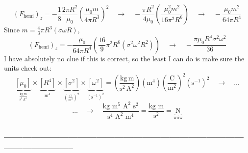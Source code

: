 \documentclass[a4paper,12pt]{article} %
\begin{document}
$$ \left(F_{\text{hemi}}\right)_z = -\frac{1}{8}\frac{2\pi R^2}{\mu_0}\left(\frac{\mu_0m}{4\pi R^3}\right)^2 \quad\rightarrow\quad -\frac{\pi R^2}{4\mu_0} \left(\frac{\mu_0^2m^2}{16\pi^2R^6}\right) \quad\rightarrow\quad -\frac{\mu_0m^2}{64\pi R^4}$$
Since $m=\frac{4}{3} \pi R^3(\sigma \omega R)$,
$$ \boxed{\left(F_{\text{hemi}}\right)_z = -\frac{\mu_0}{64\pi R^4} \left(\frac{16}{9}\pi^2 R^6 \left(\sigma^2\omega^2R^2\right)\right) \quad\rightarrow\quad -\frac{\pi\mu_0R^4\sigma^2\omega^2}{36}}$$
I have absolutely no clue if this is correct, so the least I can do is make sure the units check out:
$$
\underbrace{\left[\mu_0\right]}_{\frac{\mathrm{kg}\,\mathrm{m}}{\mathrm{s}^2\,\mathrm{A}^2}}
\times
\underbrace{\left[R^4\right]}_{\mathrm{m}^4}
\times
\underbrace{\left[\sigma^2\right]}_{\left(\frac{\mathrm{C}}{\mathrm{m}^2}\right)^2}
\times
\underbrace{\left[\omega^2\right]}_{\left(\mathrm{s}^{-1}\right)^2}
=
\left(\frac{\mathrm{kg}\,\mathrm{m}}{\mathrm{s}^2\,\mathrm{A}^2}\right)
\left(\mathrm{m}^4\right)
\left(\frac{\mathrm{C}}{\mathrm{m}^2}\right)^2
(\mathrm{s}^{-1})^2 \quad\rightarrow\quad\ldots
$$
$$ 
\ldots\quad\rightarrow\quad \frac{\text{kg} \text{ m}^5 \text{ A}^2 \text{ s}^2}{\text{s}^4 \text{ A}^2 \text{ m}^4} = \frac{\text{kg} \text{ m}}{\text{s}^2} = \underbrace{\boxed{\text{N}}}_{\text{wow}}
$$
\subsubsection*{-----------------------------------------------------------------------------------------------------}
\end{document}
